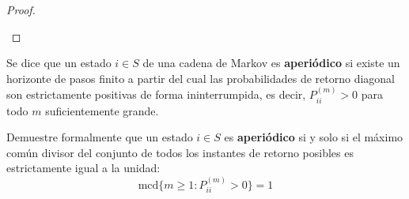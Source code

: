 \begin{coro}
\begin{proof}
\begin{description}
\end{description}
\end{proof}
\end{coro}


\begin{definicion}
    Se dice que un estado $i \in S$ de una cadena de Markov es \textbf{aperiódico} si existe un horizonte de pasos finito a partir del cual las probabilidades de retorno diagonal son estrictamente positivas de forma ininterrumpida, es decir, $P_{ii}^{(m)} > 0$ para todo $m$ suficientemente grande.
\end{definicion}

\begin{ejercicio}
    Demuestre formalmente que un estado $i \in S$ es \textbf{aperiódico} si y solo si el máximo común divisor del conjunto de todos los instantes de retorno posibles es estrictamente igual a la unidad:
    \[
    \text{mcd}\{m \geq 1 : P_{ii}^{(m)} > 0\} = 1
    \]
\end{ejercicio}


